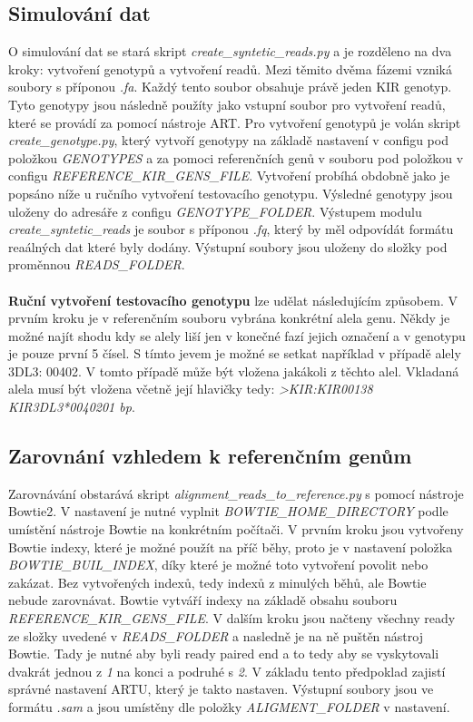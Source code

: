 \documentclass[czech,DP]{thesiskiv}
\numberwithin{equation}{section}
\begin{document}
\subsection{Simulování dat}
O simulování dat se stará skript \textit{create\_syntetic\_reads.py} a je rozděleno na dva kroky: vytvoření genotypů a vytvoření readů. Mezi těmito dvěma fázemi vzniká soubory s příponou \textit{.fa}. Každý tento soubor obsahuje právě jeden KIR genotyp. Tyto genotypy jsou následně použíty jako vstupní soubor pro vytvoření readů, které se provádí za pomocí nástroje ART. Pro vytvoření genotypů je volán skript \textit{create\_genotype.py}, který vytvoří genotypy na základě nastavení v configu pod položkou \textit{GENOTYPES} a za pomoci referenčních genů v souboru pod položkou v configu \textit{REFERENCE\_KIR\_GENS\_FILE}. Vytvoření probíhá obdobně jako je popsáno níže u ručního vytvoření testovacího genotypu. Výsledné genotypy jsou uloženy do adresáře z configu \textit{GENOTYPE\_FOLDER}. Výstupem modulu \textit{create\_syntetic\_reads} je soubor s příponou \textit{.fq}, který by měl odpovídát formátu reaálných dat které byly dodány. Výstupní soubory jsou uloženy do složky pod proměnnou \textit{READS\_FOLDER}.
\\
\\
\textbf{Ruční vytvoření testovacího genotypu} lze udělat následujícím způsobem. V prvním kroku je v referenčním souboru vybrána konkrétní alela genu. Někdy je možné najít shodu kdy se alely liší jen v konečné fazí jejich označení a v genotypu je pouze první 5 čísel. S tímto jevem je možné se setkat například v případě alely 3DL3: 00402. V tomto případě může být vložena jakákoli z těchto alel. Vkladaná alela musí být vložena včetně její hlavičky tedy: \textit{>KIR:KIR00138 \: KIR3DL3*0040201  \: bp}.

\subsection{Zarovnání vzhledem k referenčním genům}
Zarovnávání obstarává skript \textit{alignment\_reads\_to\_reference.py} s pomocí nástroje Bowtie2. V nastavení je nutné vyplnit \textit{BOWTIE\_HOME\_DIRECTORY} podle umístění nástroje Bowtie na konkrétním počítači. V prvním kroku jsou vytvořeny Bowtie indexy, které je možné použít na příč běhy, proto je v nastavení položka \textit{BOWTIE\_BUIL\_INDEX}, díky které je možné toto vytvoření povolit nebo zakázat. Bez vytvořených indexů, tedy indexů z minulých běhů, ale Bowtie nebude zarovnávat. Bowtie vytváří indexy na základě obsahu souboru \textit{REFERENCE\_KIR\_GENS\_FILE}. V dalším kroku jsou načteny všechny ready ze složky uvedené v \textit{READS\_FOLDER} a nasledně je na ně puštěn nástroj Bowtie. Tady je nutné aby byli ready paired end a to tedy aby se vyskytovali dvakrát jednou z \textit{1} na konci a podruhé s \textit{2}. V základu tento předpoklad zajistí správné nastavení ARTU, který je takto nastaven. Výstupní soubory jsou ve formátu \textit{.sam} a jsou umístěny dle položky \textit{ALIGMENT\_FOLDER} v nastavení. 
\end{document}
